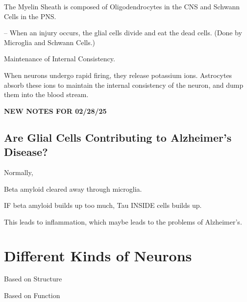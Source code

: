 \begin{coloredlist}
\begin{coloredlist}
\begin{coloredlist}
        \end{coloredlist}
        \item The Myelin Sheath is composed of Oligodendrocytes in the CNS and Schwann Cells in the PNS.
        \item {} -- When an injury occurs, the glial cells divide and eat the dead cells. (Done by Microglia and Schwann Cells.)
        \item Maintenance of Internal Consistency.
        \begin{coloredlist}
            \item When neurons undergo rapid firing, they release potassium ions. Astrocytes absorb these ions to maintain the internal consistency of the neuron, and dump them into the blood stream.
        \end{coloredlist}
    \end{coloredlist}
\end{coloredlist}

\begin{center}
    \textbf{NEW NOTES FOR 02/28/25} \\
    \hrulefill
\end{center}

\subsection{Are Glial Cells Contributing to Alzheimer's Disease?}

\begin{coloredlist}
    \item Normally,
    \begin{coloredlist}
        \item Beta amyloid cleared away through microglia.
    \end{coloredlist}
    \item IF beta amyloid builds up too much, Tau INSIDE cells builds up.
    \item This leads to inflammation, which maybe leads to the problems of Alzheimer's.
\end{coloredlist}

\section{Different Kinds of Neurons}

\begin{coloredlist}
    \item Based on Structure
    \item Based on Function
\end{coloredlist}

